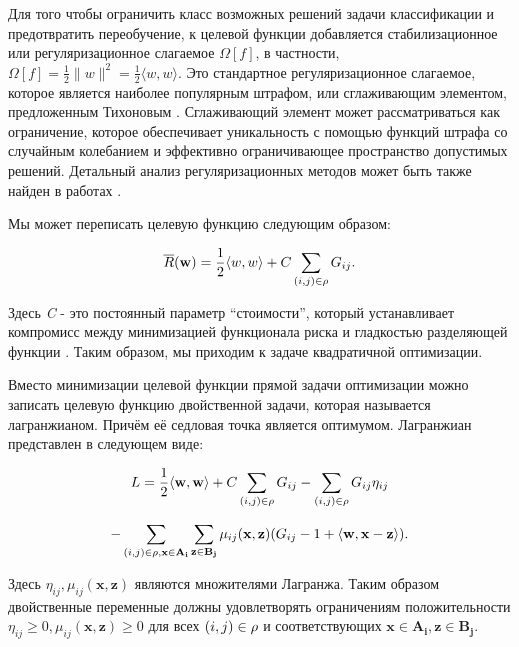 \documentclass[12pt,a4paper,oneside]{article}
\begin{document}
\par
Для того чтобы ограничить класс возможных решений задачи классификации и предотвратить переобучение, к целевой функции добавляется стабилизационное или регуляризационное слагаемое \(\Omega[f]\), в частности, \(\Omega[f] = \frac{1}{2}\|w\|^2 = \frac{1}{2} \langle w, w \rangle \). 
Это стандартное регуляризационное слагаемое, которое является наиболее популярным штрафом, или сглаживающим элементом, предложенным Тихоновым . 
Сглаживающий элемент может рассматриваться как ограничение, которое обеспечивает уникальность с помощью функций штрафа со случайным колебанием и эффективно ограничивающее пространство допустимых решений. 
Детальный анализ регуляризационных методов может быть также найден в работах  . 

\par
Мы может переписать целевую функцию следующим образом:

\[
\overline{R}(\mathbf{w}) = \frac{1}{2} \langle w, w \rangle + C \sum \limits_{(i, j) \in \mathrm{\rho}} G_{ij}. 
\]

\par
Здесь \emph{C} - это постоянный параметр ``стоимости'', который устанавливает компромисс между минимизацией функционала риска и гладкостью разделяющей функции . 
Таким образом, мы приходим к задаче квадратичной оптимизации. 

\par
Вместо минимизации целевой функции прямой задачи оптимизации можно записать целевую функцию двойственной задачи, которая называется лагранжианом. 
Причём её седловая точка является оптимумом. 
Лагранжиан представлен в следующем виде:

\[
L = \frac{1}{2} \langle \mathbf{w}, \mathbf{w} \rangle + C \sum \limits_{(i, j) \in \mathrm{\rho}} G_{ij} - \sum \limits_{(i, j) \in \mathrm{\rho}} G_{ij} \eta_{ij}
\]

\[
- \sum \limits_{(i, j) \in \mathrm{\rho}, \mathbf{x} \in \mathbf{A_i}} \sum \limits_{\mathbf{z} \in \mathbf{B_j}} \mu_{ij}(\mathbf{x}, \mathbf{z}) (G_{ij} - 1 + \langle \mathbf{w}, \mathbf{x} - \mathbf{z} \rangle).
\]

\par
Здесь \(\eta_{ij}, \mu_{ij}(\mathbf{x}, \mathbf{z})\) являются множителями Лагранжа. 
Таким образом двойственные переменные должны удовлетворять ограничениям положительности \(\eta_{ij} \geq 0, \mu_{ij} (\mathbf{x}, \mathbf{z}) \geq 0\) для всех \((i, j) \in \mathrm{\rho}\) и соответствующих \(\mathbf{x} \in \mathbf{A_i}, \mathbf{z} \in \mathbf{B_j}\). 
\end{document}
